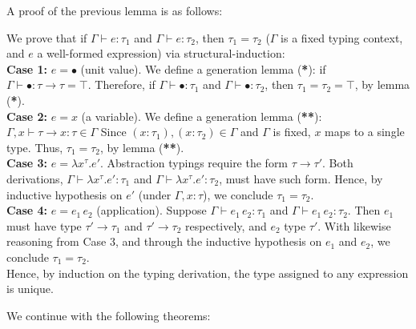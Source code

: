\noindent
A proof of the previous lemma is as follows:
\begin{Proof}

    We prove that if $\Gamma \vdash e : \tau_1$ and $\Gamma \vdash e : \tau_2$, then $\tau_1 = \tau_2$ ($\Gamma$ is a fixed typing context, and $e$ a well-formed expression)
    via structural-induction:\\

    \noindent
    \textbf{Case 1:} $e = \bullet$ (unit value).  
    We define a generation lemma (\textbf{*}): if $\Gamma \vdash \bullet : \tau \to \tau = \top$. Therefore, if 
    $\Gamma \vdash \bullet : \tau_1$ and $\Gamma \vdash \bullet : \tau_2$, then $\tau_1=\tau_2=\top$, by lemma (\textbf{*}).  
    \\

    \noindent
    \textbf{Case 2:} $e = x$ (a variable). 
    We define a generation lemma (\textbf{**}): $\Gamma,x\vdash \tau\to x:\tau \in \Gamma$ 
    Since $(x : \tau_1), (x : \tau_2) \in \Gamma$ and $\Gamma$ is fixed, $x$ maps to a single type. Thus, $\tau_1 = \tau_2$, by lemma (\textbf{**}).
    \\

    \noindent
    \textbf{Case 3:} $e = \lambda x^\tau. e'$.  
    Abstraction typings require the form $\tau \to \tau'$. Both derivations,
    $\Gamma \vdash \lambda x^\tau. e' : \tau_1$ and $\Gamma \vdash \lambda x^\tau. e' : \tau_2$,
    must have such form. Hence, by inductive hypothesis on $e'$ (under $\Gamma,x:\tau$), we conclude $\tau_1 = \tau_2$.
    \\ 

    \noindent
    \textbf{Case 4:} $e = e_1\, e_2$ (application).  
    Suppose $\Gamma \vdash e_1\, e_2 : \tau_1$ and $\Gamma \vdash e_1\, e_2 : \tau_2$.  
    Then $e_1$ must have type $\tau' \to \tau_1$ and $\tau' \to \tau_2$ respectively, and $e_2$ type $\tau'$.  
    With likewise reasoning from Case 3, and through the inductive hypothesis on $e_1$ and $e_2$, we conclude $\tau_1 = \tau_2$.
    \\

    \noindent
    Hence, by induction on the typing derivation, the type assigned to any expression is unique.

    \end{Proof}

    \newpage 

    \noindent
    We continue with the following theorems:
        
